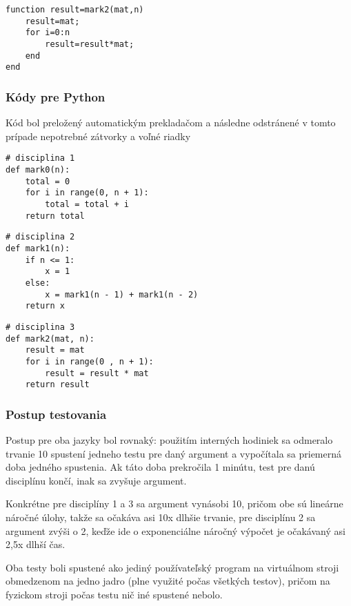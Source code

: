 \documentclass[12pt,a4paper]{article}
\begin{document}
\begin{lstlisting}[label={lst:lstlisting3}]
% disciplina 3
function result=mark2(mat,n)
    result=mat;
    for i=0:n
        result=result*mat;
    end
end
\end{lstlisting}

\subsubsection*{Kódy pre Python}
Kód bol preložený automatickým prekladačom a následne odstránené v tomto prípade nepotrebné zátvorky a voľné riadky

\lstset{language=Python}

\begin{lstlisting}[label={lst:lstlisting4}]
# disciplina 1
def mark0(n):
    total = 0
    for i in range(0, n + 1):
        total = total + i
    return total
\end{lstlisting}


\begin{lstlisting}[label={lst:lstlisting5}]
# disciplina 2
def mark1(n):
    if n <= 1:
        x = 1
    else:
        x = mark1(n - 1) + mark1(n - 2)
    return x
\end{lstlisting}


\begin{lstlisting}[label={lst:lstlisting6}]
# disciplina 3
def mark2(mat, n):
    result = mat
    for i in range(0 , n + 1):
        result = result * mat
    return result
\end{lstlisting}

\subsubsection*{Postup testovania}

Postup pre oba jazyky bol rovnaký: použitím interných hodiniek sa odmeralo trvanie 10 spustení jedneho testu pre daný argument a vypočítala sa priemerná doba jedného spustenia.
Ak táto doba prekročila 1 minútu, test pre danú disciplínu končí, inak sa zvyšuje argument.

Konkrétne pre disciplíny 1 a 3 sa argument vynásobi 10, pričom obe sú lineárne náročné úlohy, takže sa očakáva asi 10x dlhšie trvanie,
pre disciplínu 2 sa argument zvýši o 2, keďže ide o exponenciálne náročný výpočet je očakávaný asi 2,5x dlhší čas.

Oba testy boli spustené ako jediný používateľský program na virtuálnom stroji obmedzenom na jedno jadro (plne využité počas všetkých testov), pričom na fyzickom stroji počas testu nič iné spustené nebolo.
\end{document}
